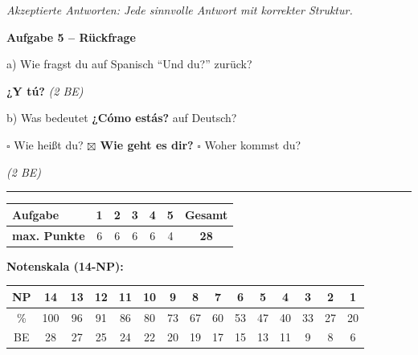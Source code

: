 \documentclass[11pt, a4paper]{article}
\newcommand{\punktebox}[1]{\hfill\fbox{\small \_\_\_/#1}}
\newcommand{\es}[1]{\textcolor{spanisch}{\textbf{#1}}}
\newcommand{\lsg}[1]{\textcolor{loesung}{\textbf{#1}}}
\begin{document}
\vspace{5pt}
\textit{Akzeptierte Antworten: Jede sinnvolle Antwort mit korrekter Struktur.}

\vspace{15pt}


\noindent\textbf{\textcolor{spanisch}{Aufgabe 5 -- Rückfrage}} \punktebox{4}

\vspace{10pt}

\noindent
a) Wie fragst du auf Spanisch ``Und du?'' zurück?

\vspace{0.4em}
\noindent \lsg{¿Y tú?} \hfill \textit{(2 BE)}

\vspace{0.8em}
\noindent
b) Was bedeutet \es{¿Cómo estás?} auf Deutsch?

\vspace{5pt}

\noindent
$\square$ Wie heißt du? \hspace{1.5cm} \lsg{$\boxtimes$ Wie geht es dir?} \hspace{1.5cm} $\square$ Woher kommst du?

\hfill \textit{(2 BE)}


\vspace{20pt}
\hrule
\vspace{10pt}

\noindent
\begin{tabularx}{\textwidth}{|X|c|c|c|c|c||c|}
\hline
\textbf{Aufgabe} & 1 & 2 & 3 & 4 & 5 & \textbf{Gesamt} \\
\hline
\textbf{max. Punkte} & 6 & 6 & 6 & 6 & 4 & \textbf{28} \\
\hline
\end{tabularx}

\vspace{15pt}

\noindent\textbf{Notenskala (14-NP):}

\vspace{5pt}

\begin{tabular}{|c|c|c|c|c|c|c|c|c|c|c|c|c|c|c|}
\hline
NP & 14 & 13 & 12 & 11 & 10 & 9 & 8 & 7 & 6 & 5 & 4 & 3 & 2 & 1 \\
\hline
\% & 100 & 96 & 91 & 86 & 80 & 73 & 67 & 60 & 53 & 47 & 40 & 33 & 27 & 20 \\
\hline
BE & 28 & 27 & 25 & 24 & 22 & 20 & 19 & 17 & 15 & 13 & 11 & 9 & 8 & 6 \\
\hline
\end{tabular}
\end{document}
